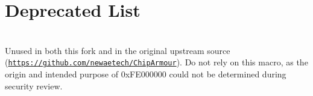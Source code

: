 \chapter{Deprecated List }
\hypertarget{deprecated}{}\label{deprecated}

\begin{DoxyRefList}
\item[{\parbox[t]{\linewidth}{Member \doxylink{group__panic_ga932353a52e15f104baecf24eb01f84ec}{ca\+\_\+false} ()}}]\hfill \\
\label{deprecated__deprecated000001}%
%
Unused in both this fork and in the original upstream source (\href{https://github.com/newaetech/ChipArmour}{\texttt{https:\+/\+/\+github.\+com/\+newaetech/\+\+Chip\+Armour}}). Do not rely on this macro, as the origin and intended purpose of 0x\+FE000000 could not be determined during security review. 
\end{DoxyRefList}